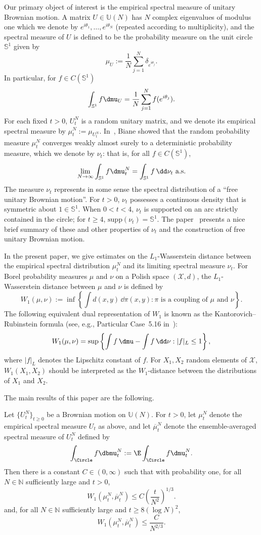 Our primary object of interest is the empirical spectral measure of unitary Brownian motion. A matrix $U\in\mathbb{U}(N)$ has $N$ complex eigenvalues of modulus one which we denote by $e^{i\theta_1},\ldots,e^{i\theta_N}$ (repeated according to multiplicity), and the spectral measure of $U$ is defined to be the probability measure on the unit circle $\mathbb{S}^1$ given by
\[
\mu_U:=\frac{1}{N}\sum_{j=1}^N \delta_{e^{i\theta_j}}.
\]
In particular, for $f\in C(\mathbb{S}^1)$
\[
\int_{\mathbb{S}^1} f \dmu_U = \frac{1}{N}\sum_{j=1}^N f(e^{i\theta_j}).
\]
For each fixed $t>0$, $U^N_t$ is a random unitary matrix, and we denote its empirical spectral measure by $\mu^N_t:=\mu_{U^N_t}$. In~\cite{Biane1997}, Biane showed that the random probability measure $\mu^N_t$ converges weakly almost surely to a deterministic probability measure, which we denote by $\nu_t$: that is, for all $f\in C(\mathbb{S}^1)$,
\[
\lim_{N\rightarrow\infty} \int_{\mathbb{S}^1} f \dmu^N_t = \int_{\mathbb{S}^1} f\,\dd\nu_t \text{ a.s.}
\]
The measure $\nu_t$ represents in some sense the spectral distribution of a ``free unitary Brownian motion''. For $t>0$, $\nu_t$ possesses a continuous density that is symmetric about $1\in\mathbb{S}^1$. When $0<t<4$, $\nu_t$ is supported on an arc strictly contained in the circle; for $t\ge4$, $\mathrm{supp}(\nu_t)=\mathbb{S}^1$. The paper~\cite{CDK2016} presents a nice brief summary of these and other properties of $\nu_t$ and the construction of free unitary Brownian motion.

In the present paper, we give estimates on the $L_1$-Wasserstein distance between the empirical spectral distribution $\mu_t^N$ and its limiting spectral measure $\nu_t$. For Borel probability measures $\mu$ and $\nu$ on a Polish space $(\mathcal{X},d)$, the $L_1$-Wasserstein distance between $\mu$ and $\nu$ is defined by
\[
W_1(\mu,\nu):=\inf \left\{\int d(x,y)\,\dd\pi(x,y): \pi \text{ is a coupling of } \mu \text{ and } \nu\right\}.
\]
The following equivalent dual representation of $W_1$ is known as the Kantorovich--Rubinstein formula (see, e.g., Particular Case~5.16 in~\cite{Vil}):
\[
W_1(\mu,\nu) = \sup \left\{\int f\,\dmu -\int f\,\dd\nu : |f|_{L}\le1 \right\},
\]
where $|f|_L$ denotes the Lipschitz constant of $f$. For $X_1,X_2$ random elements of $\mathcal{X}$, $W_1(X_1,X_2)$ should be interpreted as the $W_1$-distance between the distributions of $X_1$ and $X_2$.


The main results of this paper are the following.
\begin{thm}\label{T:main}
Let $\{U^N_t\}_{t\ge0}$ be a Brownian motion on $\mathbb{U}(N)$. For $t>0$, let $\mu_t^N$ denote the empirical spectral measure $U_t$ as above, and let $\overline{\mu}_t^N$ denote the ensemble-averaged spectral measure of $U^N_t$ defined by
\[
\int_{\Circle}f\dbmu^N_t:=\E\int_{\Circle}f\dmu^N_t.
\]
Then there is a constant $C\in(0,\infty)$ such that with probability one, for all $N\in\mathbb{N}$ sufficiently large and $t>0$,
\[
W_1(\mu^N_{t},\overline{\mu}^N_{t})\le C\left(\frac{t}{N^2}\right)^{1/3}.
\]
and, for all $N\in\mathbb{N}$ sufficiently large and $t\ge 8(\log N)^2$,
\[
W_1(\mu^N_{t},\overline{\mu}^N_{t})\le \frac{C}{N^{2/3}}.
\]
\end{thm}

